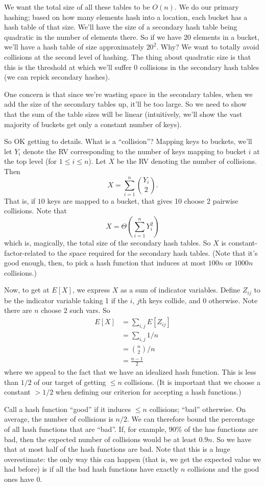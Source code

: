 \documentclass{article}
\begin{document}
We want the total size of all these tables to be $O(n)$.
We do our primary hashing; based on how many elements hash into a location,
each bucket has a hash table of that size.
We'll have the size of a secondary hash table being quadratic in the number
of elements there.
So if we have 20 elements in a bucket, we'll have a hash table of size approximately $20^2$.
Why? 
We want to totally avoid collisions at the second level of hashing.
The thing about quadratic size is that this is the threshold at which we'll
suffer 0 collisions in the secondary hash tables (we can repick secondary
hashes).

One concern is that since we're wasting space in the secondary tables,
when we add the size of the secondary tables up, it'll be too large.
So we need to show that the sum of the table sizes will be linear
(intuitively, we'll show the vast majority of buckets get only a constant number
of keys).

So OK getting to details. What is a ``collision''?
Mapping keys to buckets, we'll let $Y_i$ denote the RV corresponding
to the number of keys mapping to bucket $i$ at the top level (for $1\leq i\leq n$).
Let $X$ be the RV denoting the number of collisions.
Then
$$
X = \sum_{i=1}^n {Y_i\choose 2}.
$$
That is, if $10$ keys are mapped to a bucket, that gives 10 choose 2 pairwise
collisions.
Note that
$$
X = \Theta\left(
	\sum_{i=1}^n Y_i^2
\right)
$$
which is, magically, the total size of the secondary hash tables.
So $X$ is constant-factor-related to the space required for the secondary
hash tables.
(Note that it's good enough, then, to pick a hash function that induces
at most $100n$ or $1000n$ collisions.)

Now, to get at $E[X]$, we express $X$ as a sum of indicator variables.
Define $Z_{ij}$ to be the indicator variable taking 1 if the $i$, $j$th keys
collide, and 0 otherwise.
Note there are $n$ choose $2$ such vars.
So
\begin{align}
E[X] 
&=
\sum_{i,j} E[Z_{ij}]  \\
&=
\sum_{i,j} 1/n \\
&=
{n \choose 2} / n
\\
&= 
\frac{n-1}{2}
\end{align}
where we appeal to the fact that we have an idealized hash function.
This is less than $1/2$ of our target of getting $\leq n$ collisions.
(It is important that we choose a constant $> 1/2$ when defining
our criterion for accepting a hash functions.)

Call a hash function ``good'' if it induces $\leq n$ collisions; ``bad'' otherwise.
On average, the number of collisions is $n/2$.
We can therefore bound the percentage of all hash functions that
are ``bad''.
If, for example, 90\% of the has functions are bad, then the expected
number of collisions would be at least $0.9n$.
So we have that at most half of the hash functions are bad.
Note that this is a huge overestimate: the only way
this can happen (that is, we get the expected value we had before)
 is if all the bad hash functions have exactly $n$ collisions and the
 good ones have $0$.
\end{document}
